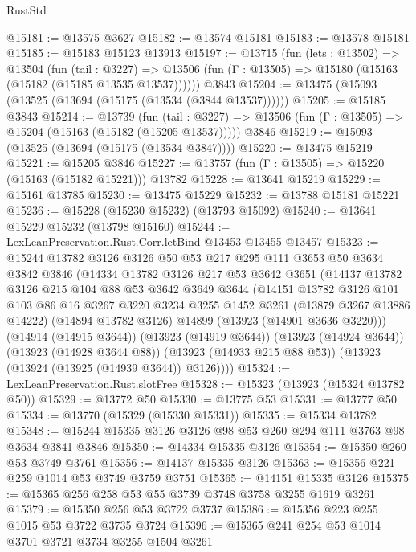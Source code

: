 \begin{lexlean}{RustStd}
\begin{coremodule}
{\begin{coremodule}
{{{{{{{{{{{{{{{{{{{{{{{{{{{{{{{{{{{{{@15181 := @13575 @3627
@15182 := @13574 @15181
@15183 := @13578 @15181
@15185 := @15183 @15123 @13913
@15197 := @13715
    (fun (lets : @13502) =>
    @13504
      (fun (tail : @3227) =>
      @13506 (fun (Γ : @13505) => @15180 (@15163 (@15182 (@15185 @13535 @13537))))))
    @3843
@15204 := @13475 (@15093 (@13525 (@13694 (@15175 (@13534 (@3844 @13537))))))
@15205 := @15185 @3843
@15214 := @13739
    (fun (tail : @3227) => @13506 (fun (Γ : @13505) => @15204 (@15163 (@15182 (@15205 @13537)))))
    @3846
@15219 := @15093 (@13525 (@13694 (@15175 (@13534 @3847))))
@15220 := @13475 @15219
@15221 := @15205 @3846
@15227 := @13757 (fun (Γ : @13505) => @15220 (@15163 (@15182 @15221))) @13782
@15228 := @13641 @15219
@15229 := @15161 @13785
@15230 := @13475 @15229
@15232 := @13788 @15181 @15221
@15236 := @15228 (@15230 @15232) (@13793 @15092)
@15240 := @13641 @15229 @15232 (@13798 @15160)
@15244 := LexLeanPreservation.Rust.Corr.letBind @13453 @13455 @13457
@15323 := @15244
    @13782
    @3126
    @3126
    @50
    @53
    @217
    @295
    @111
    @3653
    @50
    @3634
    @3842
    @3846
    (@14334
      @13782
      @3126
      @217
      @53
      @3642
      @3651
      (@14137
        @13782
        @3126
        @215
        @104
        @88
        @53
        @3642
        @3649
        @3644
        (@14151
          @13782
          @3126
          @101
          @103
          @86
          @16
          @3267
          @3220
          @3234
          @3255
          @1452
          @3261
          (@13879 @3267 @13886 @14222)
          (@14894 @13782 @3126)
          @14899
          (@13923 (@14901 @3636 @3220)))
        (@14914 (@14915 @3644))
        (@13923 (@14919 @3644))
        (@13923 (@14924 @3644))
        (@13923 (@14928 @3644 @88))
        (@13923 (@14933 @215 @88 @53))
        (@13923 (@13924 (@13925 (@14939 @3644)) @3126))))
@15324 := LexLeanPreservation.Rust.slotFree
@15328 := @15323 (@13923 (@15324 @13782 @50))
@15329 := @13772 @50
@15330 := @13775 @53
@15331 := @13777 @50
@15334 := @13770 (@15329 (@15330 @15331))
@15335 := @15334 @13782
@15348 := @15244 @15335 @3126 @3126 @98 @53 @260 @294 @111 @3763 @98 @3634 @3841 @3846
@15350 := @14334 @15335 @3126
@15354 := @15350 @260 @53 @3749 @3761
@15356 := @14137 @15335 @3126
@15363 := @15356 @221 @259 @1014 @53 @3749 @3759 @3751
@15365 := @14151 @15335 @3126
@15375 := @15365 @256 @258 @53 @55 @3739 @3748 @3758 @3255 @1619 @3261
@15379 := @15350 @256 @53 @3722 @3737
@15386 := @15356 @223 @255 @1015 @53 @3722 @3735 @3724
@15396 := @15365 @241 @254 @53 @1014 @3701 @3721 @3734 @3255 @1504 @3261
}}}}}}}}}}}}}}}}}}}}}}}}}}}}}}}}}}}}}
\end{coremodule}}
\end{coremodule}
\end{lexlean}

